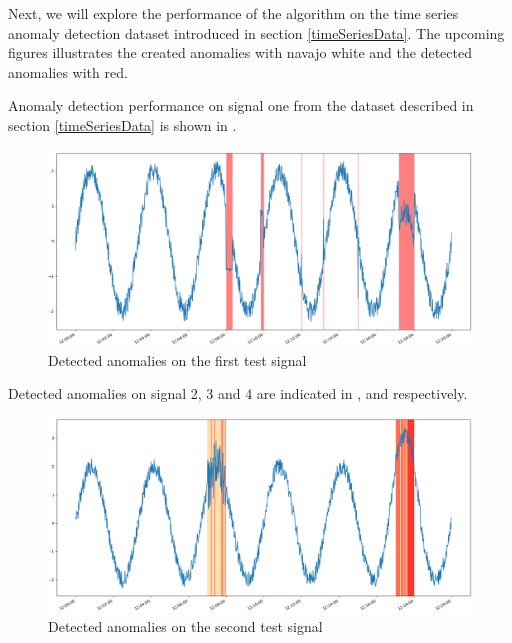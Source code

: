 \documentclass[english, a4paper]{report}
\begin{document}
{{{            Next, we will explore the performance of the algorithm on the time series anomaly detection dataset introduced in section \ref{timeSeriesData}. The upcoming figures illustrates the created anomalies with navajo white and the detected anomalies with red.
            \par
            Anomaly detection performance on signal one from the dataset described in section \ref{timeSeriesData} is shown in .
            \begin{figure}[H]
                \centering
                \includegraphics[width=\textwidth]{AnomType1Res}
                \caption{Detected anomalies on the first test signal}
                \label{fig:AnomType1Res}
            \end{figure}
            
            Detected anomalies on signal 2, 3 and 4 are indicated in ,  and  respectively.
    
            \begin{figure}[H]
                \centering
                \includegraphics[width=\textwidth]{AnomType2Res}
                \caption{Detected anomalies on the second test signal}
                \label{fig:AnomType2Res}
            \end{figure}
            
}}}
\end{document}
